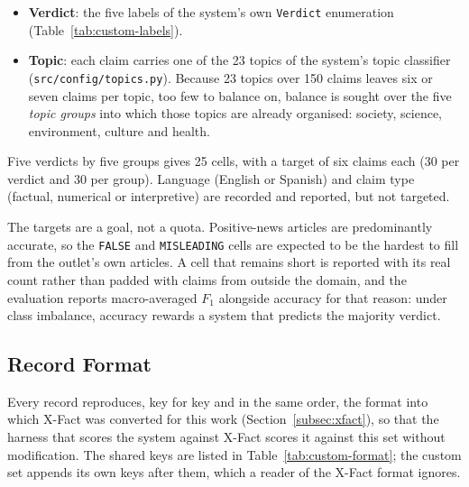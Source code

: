 \begin{itemize}
    \item \textbf{Verdict}: the five labels of the system's own
    \texttt{Verdict} enumeration (Table~\ref{tab:custom-labels}).
    \item \textbf{Topic}: each claim carries one of the 23 topics of
    the system's topic classifier (\texttt{src/config/topics.py}).
    Because 23 topics over 150 claims leaves six or seven claims per
    topic, too few to balance on, balance is sought over the five
    \emph{topic groups} into which those topics are already
    organised: society, science, environment, culture and health.
\end{itemize}

Five verdicts by five groups gives 25 cells, with a target of six
claims each (30 per verdict and 30 per group). Language (English or
Spanish) and claim type (factual, numerical or interpretive) are
recorded and reported, but not targeted.

The targets are a goal, not a quota. Positive-news articles are
predominantly accurate, so the \texttt{FALSE} and \texttt{MISLEADING}
cells are expected to be the hardest to fill from the outlet's own
articles. A cell that remains short is reported with its real count
rather than padded with claims from outside the domain, and the
evaluation reports macro-averaged $F_1$ alongside accuracy for that
reason: under class imbalance, accuracy rewards a system that
predicts the majority verdict.

\subsection{Record Format}
\label{subsec:custom-format}

Every record reproduces, key for key and in the same order, the
format into which X-Fact was converted for this work
(Section~\ref{subsec:xfact}), so that the harness that scores the
system against X-Fact scores it against this set without
modification. The shared keys are listed in
Table~\ref{tab:custom-format}; the custom set appends its own keys
after them, which a reader of the X-Fact format ignores.

